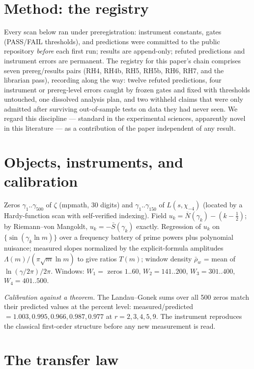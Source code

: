 \documentclass[11pt]{article}
\theoremstyle{definition}
\theoremstyle{remark}
\newcommand{\Nbar}{\overline{N}}
\begin{document}
\section{Method: the registry}

Every scan below ran under preregistration: instrument constants, gates (PASS/FAIL thresholds),
and predictions were committed to the public repository \cite{Code} \emph{before} each first run;
results are append-only; refuted predictions and instrument errors are permanent. The registry for
this paper's chain comprises seven prereg/results pairs (RH4, RH4b, RH5, RH5b, RH6, RH7, and the
librarian pass), recording along the way: twelve refuted predictions, four instrument or
prereg-level errors caught by frozen gates and fixed with thresholds untouched, one dissolved
analysis plan, and two withheld claims that were only admitted after surviving out-of-sample tests
on data they had never seen. We regard this discipline --- standard in the experimental sciences,
apparently novel in this literature --- as a contribution of the paper independent of any result.

\section{Objects, instruments, and calibration}

Zeros $\gamma_1..\gamma_{500}$ of $\zeta$ (mpmath, 30 digits) and $\gamma_1..\gamma_{150}$ of
$L(s,\chi_{-4})$ (located by a Hardy-function scan with self-verified indexing). Field
$u_k = \Nbar(\gamma_k) - (k-\tfrac12)$; by Riemann--von Mangoldt, $u_k = -\bar S(\gamma_k)$
exactly. Regression of $u_k$ on $\{\sin(\gamma_k \ln m)\}$ over a frequency battery of prime
powers plus polynomial nuisance; measured slopes normalized by the explicit-formula amplitudes
$\Lambda(m)/(\pi\sqrt m \ln m)$ to give ratios $T(m)$; window density $\bar\rho_w$ = mean of
$\ln(\gamma/2\pi)/2\pi$. Windows: $W_1 = $ zeros $1..60$, $W_2 = 141..200$, $W_3 = 301..400$,
$W_4 = 401..500$.

\emph{Calibration against a theorem.} The Landau--Gonek sums over all 500 zeros match their
predicted values at the percent level: measured/predicted $= 1.003, 0.995, 0.966, 0.987, 0.977$
at $r = 2, 3, 4, 5, 9$. The instrument reproduces the classical first-order structure before any
new measurement is read.

\section{The transfer law}
\end{document}
